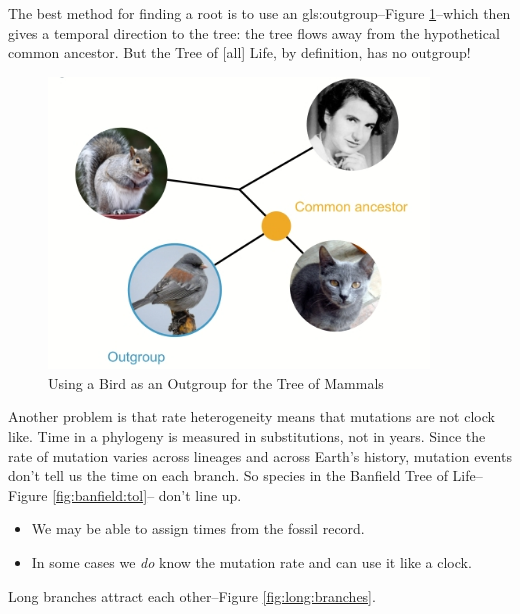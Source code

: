 \documentclass[]{article}
\begin{document}
The best method for finding a root is to use an \gls{gls:outgroup}--Figure \ref{fig:bird:outgroup}--which then gives a temporal direction to the tree: the tree flows away from the hypothetical common ancestor. But the Tree of [all] Life, by definition, has no outgroup!

\begin{figure}[H]
	\caption{Using a Bird as an Outgroup for the Tree of Mammals}\label{fig:bird:outgroup}
	\includegraphics[width=0.9\textwidth]{Outgroup}
\end{figure}

Another problem is that rate heterogeneity means that mutations are not clock like\cite{sanderson2003r8s,smit2007evolutionary}. Time in a phylogeny is measured in substitutions, not in years. Since the rate of mutation varies across lineages and across Earth's history, mutation events don't tell us the time on each branch. So species in the Banfield Tree of Life--Figure \ref{fig:banfield:tol}-- don't line up.
\begin{itemize}
	\item We may be able to assign times from the fossil record.
	\item In some cases we \textit{do} know the mutation rate and can use it like a clock.
\end{itemize}

Long branches attract each other\cite{philippe2005heterotachy}--Figure \ref{fig:long:branches}.
\end{document}
